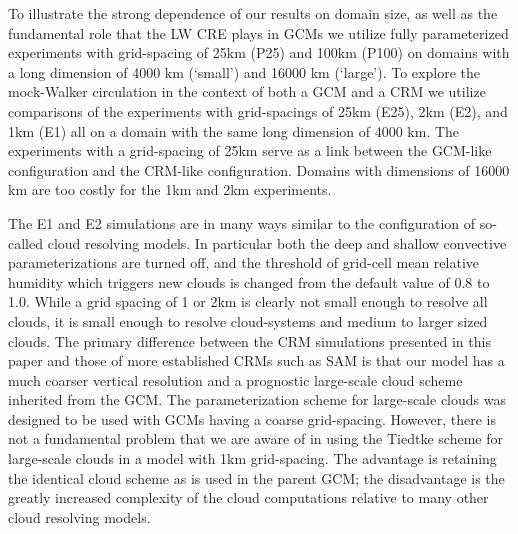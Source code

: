 \documentclass[draft]{agujournal2019}
\begin{document}
To illustrate the strong dependence of our results on domain size, as well as the fundamental role that the LW CRE plays in GCMs
we utilize fully parameterized experiments with grid-spacing of 25km (P25) and 100km (P100) on domains with a long dimension 
of 4000 km (`small') and
16000 km (`large').  To explore the mock-Walker circulation in the context of both a GCM and a CRM we utilize 
comparisons of the experiments with grid-spacings of 25km (E25), 2km (E2), and 1km (E1) all on a domain with the same long dimension 
of 4000 km.  The experiments with a grid-spacing of 25km serve as a link between the GCM-like configuration and the CRM-like 
configuration.  Domains with dimensions of 16000 km are too costly for the 1km and 2km experiments.

The E1 and E2 simulations are in many ways similar to the configuration of so-called cloud resolving models.  
In particular both the deep and shallow convective parameterizations are turned off, and the threshold of grid-cell mean relative humidity 
which triggers new clouds is changed from the default value of 0.8 to 1.0.  While a grid spacing of 1 or 2km is clearly not small enough
to resolve all clouds, it is small enough to resolve cloud-systems and medium to larger sized clouds.  The primary 
difference between the CRM simulations presented in this paper and those of more established CRMs such as SAM is that our model
has a much coarser vertical resolution and a prognostic large-scale cloud scheme inherited from the GCM.  The  
parameterization scheme for large-scale 
clouds was designed to be used with GCMs having a coarse grid-spacing.  However, there is not a fundamental problem that we are 
aware of in using the Tiedtke scheme for large-scale clouds in a model with 1km grid-spacing.   The advantage is retaining the 
identical cloud scheme as is used in the parent GCM; the disadvantage is the greatly increased complexity of the cloud computations 
relative to many other cloud resolving models.    
\end{document}

